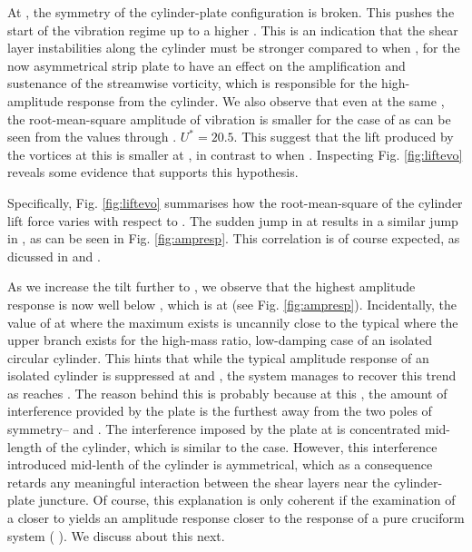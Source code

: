 \documentclass[a4paper]{article}
\begin{document}
At \ptlt{} \es{} \ron{}, the symmetry of the cylinder-plate configuration is broken. This pushes the start of the vibration regime up to a higher \ured{} \es{} \urni{}. This is an indication that the shear layer instabilities along the cylinder must be stronger compared to when \ptlt{} \es{} \rze{}, for the now asymmetrical strip plate to have an effect on the amplification and sustenance of the streamwise vorticity, which is responsible for the high-amplitude response from the cylinder. We also observe that even at the same \ured{}, the root-mean-square amplitude of vibration is smaller for the case of \ron{} as can be seen from the \yrms{} values \ured{} \es{} \urni{} through \urtt{}. $U^{*}=20.5$. This suggest that the lift produced by the vortices at this \ptlt{} is smaller at \ron{}, in contrast to when \ptlt{} \es{} \rze{}. Inspecting Fig. \ref{fig:liftevo} reveals some evidence that supports this hypothesis.

Specifically, Fig. \ref{fig:liftevo} summarises how the root-mean-square of the cylinder lift force varies with respect to \ured{}. The sudden jump in \flrms{} at \ured{} \es{} \urni{} results in a similar jump in \yrms{}, as can be seen in Fig. \ref{fig:ampresp}. This correlation is of course expected, as dicussed in \textcite{Raghavan2007} and \textcite{Bernitsas2008}.

As we increase the tilt further to \rtw{}, we observe that the highest amplitude response is now well below \ured{} \es{} \urni{}, which is at \ured{} \es{} \urth{} (see Fig. \ref{fig:ampresp}). Incidentally, the value of \urth{} at where the maximum \yrms{} exists is uncannily close to the typical \ured{} where the upper branch exists for the high-mass ratio, low-damping case of an isolated circular cylinder. This hints that while the typical amplitude response of an isolated cylinder is suppressed at \ptlt{} \rze{} and \ron{}, the system manages to recover this trend as \ptlt{} reaches \rth{}. The reason behind this is probably because at this \ptlt{}, the amount of interference provided by the plate is the furthest away from the two poles of symmetry--\ptlt{} \es{} \rze{} and \rfo{}. The interference imposed by the plate at \ptlt{} \es{} \rtw{} is concentrated mid-length of the cylinder, which is similar to the \ptlt{} \es{} \rfo{} case. However, this interference introduced mid-lenth of the cylinder is aymmetrical, which as a consequence retards any meaningful interaction between the shear layers near the cylinder-plate juncture. Of course, this explanation is only coherent if the examination of a \ptlt{} closer to \rfo{} yields an amplitude response closer to the response of a pure cruciform system (\ptlt{} \es{} \rfo{}). We discuss about this next.
\end{document}
